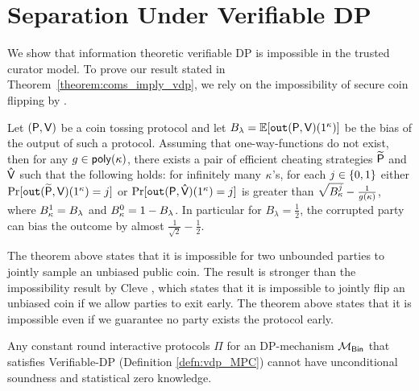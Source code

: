 \section{Separation Under Verifiable DP}
\label{sec:separation}

We show that information theoretic verifiable DP is impossible in the trusted curator model.
To prove our result stated in Theorem~\ref{theorem:coms_imply_vdp}, we rely on the impossibility of secure coin flipping by \cite{haitner2014coin}.


\begin{thm}\cite{haitner2014coin}  \label{theorem:coin_flip_implies_one_way_functions} 
Let $(\mathsf{P}, \mathsf{V})$ be a coin tossing protocol and let $B_\lambda = \mathbb{E}[\texttt{out}(\mathsf{P}, \mathsf{V})(1^\kappa)]$ be the bias of the output of such a protocol. 
Assuming that one-way-functions do not exist, then for any $g \in \mathsf{poly}(\kappa)$, 
there exists a pair of efficient cheating strategies $\mathsf{\widetilde{P}}$ and $\mathsf{\hat{V}}$ such that the following holds:
for infinitely many $\kappa$'s, for each $j \in \{ 0, 1\}$ either $\Pr[\texttt{out}(\mathsf{\widetilde{P}} , \mathsf{V})(1^\kappa) = j]$ or $\Pr[\texttt{out}(\mathsf{P}, \mathsf{\hat{V}})(1^\kappa)= j]$ is greater than $\sqrt{B_\kappa^j} - \frac{1}{g(\kappa)}$, where $B_\kappa^1 = B_\lambda$ and $B_\kappa^0 = 1 - B_\lambda$. In particular for $B_\lambda=\frac{1}{2}$, the corrupted party can bias the outcome by almost $\frac{1}{\sqrt{2}} - \frac{1}{2}$.
\end{thm}

The theorem above states that it is impossible for two unbounded parties to jointly sample an unbiased public coin. The result is stronger than the impossibility result by Cleve \cite{cleve1986limits}, which states that it is impossible to jointly flip an unbiased coin if we allow parties to exit early. 
The theorem above states that it is impossible even if we guarantee no party exists the protocol early.

\begin{thm}  
\label{theorem:coms_imply_vdp}  
Any constant round interactive protocols $\Pi$ for an DP-mechanism $\mathcal{M}_{\mathsf{Bin}}$ that satisfies Verifiable-DP (Definition \ref{defn:vdp_MPC}) cannot have unconditional soundness and statistical zero knowledge.
\end{thm}

